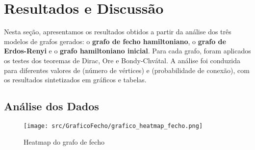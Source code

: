 \documentclass[12pt, openright, oneside, a4paper, chapter=TITLE, section=TITLE, subsection=TITLE, subsubsection=TITLE, brazil]{abntex2}
\begin{document}

\chapter{Resultados e Discussão}
\hspace{1.25cm}Nesta seção, apresentamos os resultados obtidos a partir da análise dos três modelos de grafos gerados: o \textbf{grafo de fecho hamiltoniano}, o \textbf{grafo de Erdos-Renyi} e o \textbf{grafo hamiltoniano inicial}. Para cada grafo, foram aplicados os testes dos teoremas de Dirac, Ore e Bondy-Chvátal. A análise foi conduzida para diferentes valores de  (número de vértices) e  (probabilidade de conexão), com os resultados sintetizados em gráficos e tabelas.

\section{Análise dos Dados}

\begin{figure}[h]
    \centering
    \texttt{[image: src/GraficoFecho/grafico\_heatmap\_fecho.png]}
    \caption{Heatmap do grafo de fecho}
    \label{fig:Heatmap do grafo de fecho}
\end{figure}
\end{document}

